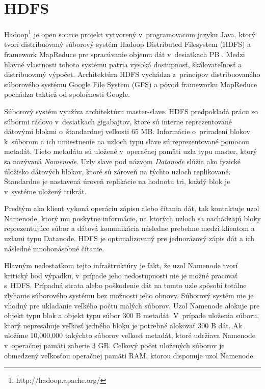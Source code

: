 \documentclass[11pt,twoside,a4paper]{book}
\begin{document}
\section*{HDFS}

Hadoop\footnote{http://hadoop.apache.org/} je open source projekt vytvorený v~programovacom jazyku Java, ktorý tvorí distribuovaný súborový systém Hadoop Distributed Filesystem (HDFS) a framework MapReduce pre spracúvanie objemu dát v~desiatkach PB \cite{Thusoo:2010:DWA:1807167.1807278}. Medzi hlavné vlastnosti tohoto systému patria vysoká dostupnosť, škálovateľnosť a distribuovaný výpočet. Architektúra HDFS vychádza z~princípov distribuovaného súborového systému Google File System (GFS) \cite{Ghemawat:2003:GFS:945445.945450} a pôvod frameworku MapReduce \cite{Dean:2008:MSD:1327452.1327492} pochádza taktiež od spoločnosti Google.

 


Súborový systém využíva architektúru master-slave. HDFS predpokladá prácu so súbormi rádovo v~desiatkach gigabajtov, ktoré sú interne reprezentované dátovými blokmi o~štandardnej veľkosti 65 MB. Informácie o~priradení blokov k~súborom a ich umiestnenie na uzloch typu slave sú reprezentované pomocou metadát. Tieto metadáta sú uložené v~operačnej pamäti uzla typu master, ktorý sa nazývaná \emph{Namenode}. Uzly slave pod názvom \emph{Datanode} slúžia ako fyzické úložisko dátových blokov, ktoré sú zároveň na týchto uzloch replikované. Štandardne je nastavená úroveň replikácie na hodnotu tri,
každý blok je v~systéme uložený trikrát.

Predtým ako klient vykoná operáciu zápisu alebo čítania dát, tak kontaktuje uzol Namenode, ktorý mu poskytne informácie, na ktorých uzloch sa nachádzajú bloky reprezentujúce súbor a dátová komunikácia následne prebehne medzi klientom a uzlami typu Datanode. HDFS je optimalizovaný pre jednorázový zápis dát a ich následné mnohonásobné čítanie.


Hlavným nedostatkom tejto infraštruktúry je fakt, že uzol Namenode tvorí kritický bod výpadku, v~prípade jeho nedostupnosti nie je možné pracovať s~HDFS. Prípadná strata alebo poškodenie dát na tomto uzle spôsobí totálne zlyhanie súborového systému bez možnosti jeho obnovy. Súborový systém nie je vhodný pre ukladanie veľkého počtu malých súborov.
Uzol Namenode alokuje pre objekt typu blok a objekt typu súbor 300 B metadát. V~prípade uloženia súboru, ktorý nepresahuje veľkosť jedného bloku je potrebné alokovať 300 B dát. Ak uložíme 10,000,000 takýchto súborov veľkosť metadát, ktoré udržiava Namenode v~operačnej pamäti zaberie 3 GB. Celkový počet uložených súborov je obmedzený veľkosťou operačnej pamäti RAM, ktorou disponuje uzol Namenode.
\end{document}
